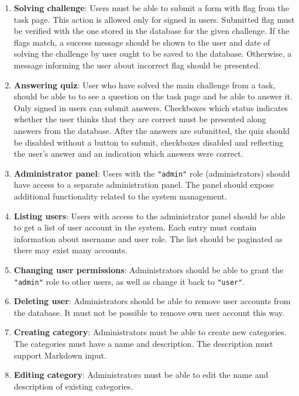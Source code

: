 \begin{enumerate}
	\item \textbf{Solving challenge}: Users must be able to submit a form with flag from the task page. This action is allowed only for signed in users. Submitted flag must be verified with the one stored in the database for the given challenge. If the flags match, a success message should be shown to the user and date of solving the challenge by user ought to be saved to the database. Otherwise, a message informing the user about incorrect flag should be presented.

	\item \textbf{Answering quiz}: User who have solved the main challenge from a task, should be able to to see a question on the task page and be able to answer it. Only signed in users can submit answers. Checkboxes which status indicates whether the user thinks that they are correct must be presented along answers from the database. After the answers are submitted, the quiz should be disabled without a button to submit, checkboxes disabled and reflecting the user's answer and an indication which answers were correct.

	\item \textbf{Administrator panel}: Users with the \texttt{"admin"} role (administrators) should have access to a separate administration panel. The panel should expose additional functionality related to the system management.

	\item \textbf{Listing users}: Users with access to the administrator panel should be able to get a list of user account in the system. Each entry must contain information about username and user role. The list should be paginated as there may exist many accounts.

	\item \textbf{Changing user permissions}: Administrators should be able to grant the \texttt{"admin"} role to other users, as well as change it back to \texttt{"user"}.

	\item \textbf{Deleting user}: Administrators should be able to remove user accounts from the database. It must not be possible to remove own user account this way.

	\item \textbf{Creating category}: Administrators must be able to create new categories. The categories must have a name and description. The description must support Markdown input.

	\item \textbf{Editing category}: Administrators must be able to edit the name and description of existing categories.


\end{enumerate}

